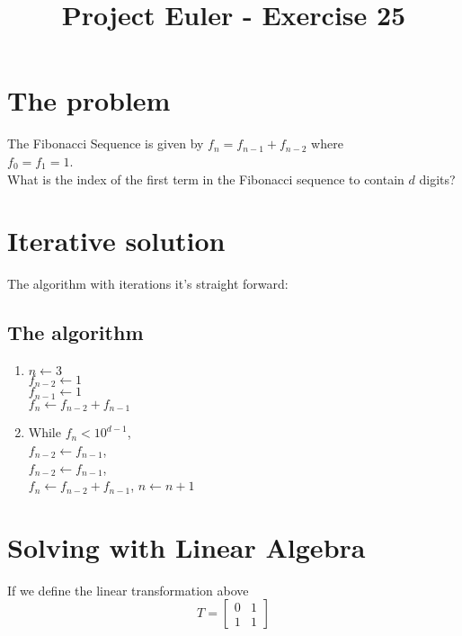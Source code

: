 \documentclass{article}
\title{Project Euler - Exercise 25}
\date{}
\begin{document}
\maketitle

\section*{The problem}
The Fibonacci Sequence is given by $f_n = f_{n - 1} + f_{n - 2}$
where\\ $f_0= f_1 = 1$.\\

What is the index of the first term in the Fibonacci sequence to contain 
$d$ digits?

\section*{Iterative solution}

The algorithm with iterations it's straight forward:

\subsection*{The algorithm}
\begin{enumerate}
    \item $n \leftarrow 3$\\
    $f_{n - 2} \leftarrow 1$\\
    $f_{n - 1} \leftarrow 1$\\
    $f_n \leftarrow f_{n - 2} + f_{n - 1}$
    \item While $f_n < 10^{d - 1}$, \\
    $ f_{n-2} \leftarrow f_{n - 1}$,\\
    $f_{n-2} \leftarrow f_{n - 1}$, \\
    $f_n \leftarrow f_{n - 2} + f_{n - 1}$,
    $n \leftarrow n + 1$
\end{enumerate}

\section*{Solving with Linear Algebra}

If we define the linear transformation above
\begin{equation*}
    T =
    \begin{bmatrix}
        0 & 1\\
        1 & 1
    \end{bmatrix}
\end{equation*}
\end{document}

